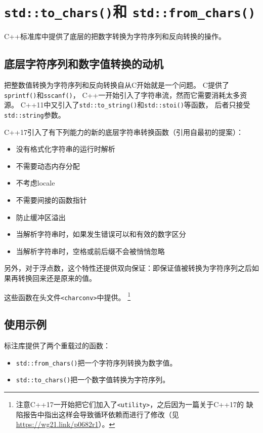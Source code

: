 \chapter{\texttt{std::to\_chars()}和
\texttt{std::from\_chars()}}\label{ch31}
C++标准库中提供了底层的把数字转换为字符序列和反向转换的操作。


\section{底层字符序列和数字值转换的动机}
把整数值转换为字符序列和反向转换自从C开始就是一个问题。
C提供了\texttt{sprintf()}和\texttt{sscanf()}，
C++一开始引入了字符串流，然而它需要消耗太多资源。
C++11中又引入了\texttt{std::to\_string()}和\texttt{std::stoi()}等函数，
后者只接受\texttt{std::string}参数。

C++17引入了有下列能力的新的底层字符串转换函数（引用自最初的提案）：
\begin{itemize}
    \item 没有格式化字符串的运行时解析
    \item 不需要动态内存分配
    \item 不考虑locale
    \item 不需要间接的函数指针
    \item 防止缓冲区溢出
    \item 当解析字符串时，如果发生错误可以和有效的数字区分
    \item 当解析字符串时，空格或前后缀不会被悄悄忽略
\end{itemize}
另外，对于浮点数，这个特性还提供双向保证：即保证值被转换为字符序列之后如果再转换回来还是原来的值。

这些函数在头文件\texttt{<charconv>}中提供。
\footnote{注意C++17一开始把它们加入了\texttt{<utility>}，之后因为一篇关于C++17的
缺陷报告中指出这样会导致循环依赖而进行了修改（见\url{https://wg21.link/p0682r1}）。}


\section{使用示例}
标注库提供了两个重载过的函数：
\begin{itemize}
    \item \texttt{std::from\_chars()}把一个字符序列转换为数字值。
    \item \texttt{std::to\_chars()}把一个数字值转换为字符序列。
\end{itemize}

